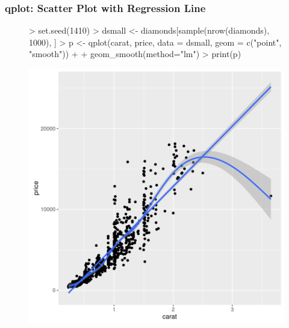 \documentclass{beamer}
\begin{document}
\begin{frame}[containsverbatim]  
	\frametitle{qplot: Scatter Plot with Regression Line}
\scriptsize 
\begin{figure}
  \centering
\begin{Schunk}
\begin{Sinput}
> set.seed(1410)
> dsmall <- diamonds[sample(nrow(diamonds), 1000), ]
> p <- qplot(carat, price, data = dsmall, geom = c("point", "smooth")) +
+            geom_smooth(method="lm")
> print(p)
\end{Sinput}
\end{Schunk}
\includegraphics{fig--037}
\label{fig:qplotscatter}
\end{figure}
\end{frame}
\end{document}
